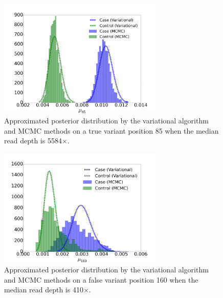 \documentclass[11pt,reqno]{amsart}
\begin{document}
\begin{figure}[htbp]
\centering
\includegraphics[width=0.7\textwidth]{figs/position_85_5584_mcmc_vs_var_mu_fig1.png}
\caption{Approximated posterior distribution by the variational algorithm and MCMC methods on a true variant position 85 when the median read depth is 5584$\times$.}
\label{tbl:compare1}
\end{figure}

\begin{figure}[htbp]
\centering
\includegraphics[width=0.7\textwidth]{figs/position_160_410_mcmc_vs_var_mu_fig2.png}
\caption{Approximated posterior distribution by the variational algorithm and MCMC methods on a false variant position 160 when the median read depth is 410$\times$.}
\label{tbl:compare2}
\end{figure}
\end{document}
